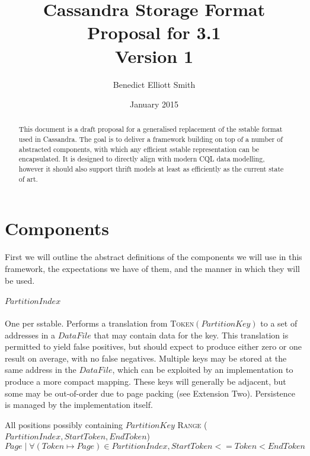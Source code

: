 \documentclass[fleqn]{article}
\title{Cassandra Storage Format\\Proposal for 3.1\\Version 1}
\author{Benedict Elliott Smith}
\date{January 2015}
\begin{document}
\maketitle

\begin{abstract}
This document is a draft proposal for a generalised replacement of the sstable format used in Cassandra.
The goal is to deliver a framework building on top of a number of abstracted components, with which
any efficient sstable representation can be encapsulated. It is designed to directly align with modern CQL
data modelling, however it should also support thrift models at least as efficiently as the current state of art.
\end{abstract}

\small

\section{Components}
First we will outline the abstract definitions of the components we will use in this framework, the
expectations we have of them, and the manner in which they will be used.
\subparagraph{$PartitionIndex$}
\subparagraph{}
    One per sstable. Performs a translation from \textsc{Token}$(PartitionKey)$ to a set of addresses 
    in a $DataFile$ that may contain data for the key. This translation is permitted to yield false positives, 
    but should expect to produce either zero or one result on average, with no false negatives. Multiple keys 
    may be stored at the same address in the $DataFile$, which can be exploited by an implementation to produce a 
    more compact mapping. These keys will generally be adjacent, but some may be out-of-order due to page 
    packing (see Extension Two). Persistence is managed by the implementation itself.
    \\
    \begin{algorithmic}[2]
    \scriptsize
    \Statex \Return All positions possibly containing $PartitionKey$
    \EndFunction
     \textsc{Range} ({$PartitionIndex, StartToken, EndToken$})
    \Statex \Return ${Page \mid \forall (Token \mapsto Page) \in PartitionIndex, StartToken <= Token < EndToken }$
    \end{algorithmic}
\end{document}
